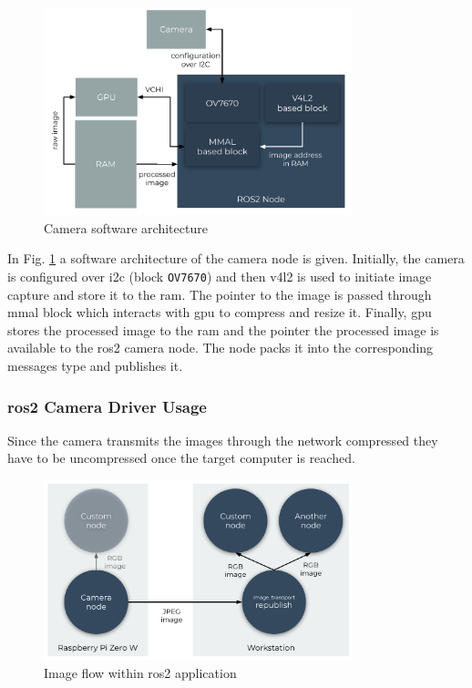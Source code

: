  \begin{figure}[H]
    \centering
    \includegraphics[width=0.8\textwidth]{physical/figures/camera_software_architecture.pdf}
    \caption{Camera software architecture}
    \label{fig:physical:camera_software_architecture}
\end{figure}
 
 In Fig. \ref{fig:physical:camera_software_architecture} a software architecture of the camera node is given. 
 Initially, the camera is configured over \ac{i2c} (block \texttt{OV7670}) and then \ac{v4l2} is used to initiate image capture and store it to the \ac{ram}.
 The pointer to the image is passed through \ac{mmal} block which interacts with \ac{gpu} to compress and resize it. 
 Finally, \ac{gpu} stores the processed image to the \ac{ram} and the pointer the processed image is available to the \ac{ros2} camera node.
 The node packs it into the corresponding messages type and publishes it.
 
 \subsubsection{\ac{ros2} Camera Driver Usage}
 Since the camera transmits the images through the network compressed they have to be uncompressed once the target computer is reached.
 
\begin{figure}[H]
    \centering
    \includegraphics[width=0.8\textwidth]{physical/figures/camera_ros_images.pdf}
    \caption{Image flow within \ac{ros2} application}
    \label{fig:physical:camera_ros_images}
\end{figure}

